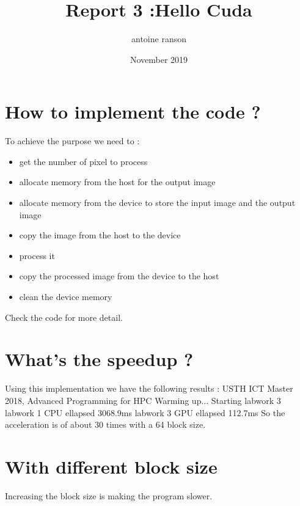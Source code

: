 \documentclass{article}
\title{Report 3 :Hello Cuda}
\author{antoine ranson }
\date{November 2019}
\begin{document}
 
\maketitle 
\section{How to implement the code ?} 
To achieve the purpose we need to : 
\begin{itemize} 
\item get the number of pixel to process 
\item allocate memory from the host for the output image 
\item allocate memory from the device to store the input image and the output image 
\item copy the image from the host to the device 
\item process it 
\item copy the processed image from the device to the host 
\item clean the device memory 
\end{itemize} 
Check the code for more detail.
 
\section{What's the speedup ?} 
Using this implementation we have the following results :\newline 
USTH ICT Master 2018, Advanced Programming for HPC\newline 
Warming up... \newline 
Starting labwork 3 \newline 
labwork 1 CPU ellapsed 3068.9ms \newline
labwork 3 GPU ellapsed 112.7ms \newline 
So the acceleration is of about 30 times with a 64 block size. 

\section{With different block size}
Increasing the block size is making the program slower. 
\end{document}

